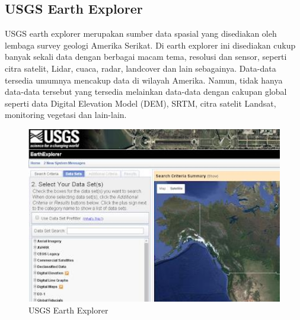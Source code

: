 \subsection{USGS Earth Explorer}
USGS earth explorer merupakan sumber data spasial yang disediakan oleh lembaga survey geologi Amerika Serikat. Di earth explorer ini disediakan cukup banyak sekali data dengan berbagai macam tema, resolusi dan sensor, seperti citra satelit, Lidar, cuaca, radar, landcover dan lain sebagainya. Data-data tersedia umumnya mencakup data di wilayah Amerika. Namun, tidak hanya data-data tersebut yang tersedia melainkan data-data dengan cakupan global seperti data Digital Elevation Model (DEM), SRTM, citra satelit Landsat, monitoring vegetasi dan lain-lain.
\begin{figure}[htbp]
\centering
\includegraphics[width=1\textwidth]{pictures/usgs_earth_explorer}
\caption{USGS Earth Explorer}
\label{labelgambar2}
\end{figure}

